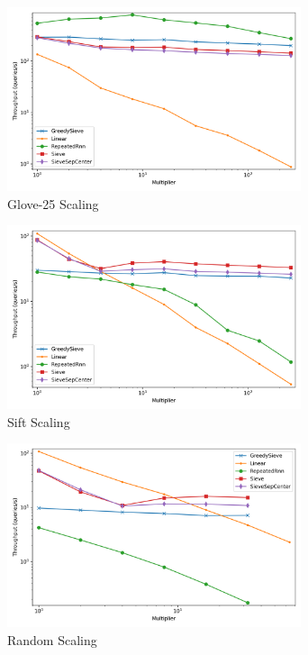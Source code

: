 

\begin{figure}[ht!]
    \centering
    \includegraphics[width=3.4in]{images/result_plots/glove-25_10_scaling.png}
    \caption{
        Glove-25 Scaling
    }
    \label{fig:results:glove-25-scaling}
\end{figure}


\begin{figure}[ht!]
    \centering
    \includegraphics[width=3.4in]{images/result_plots/sift_10_scaling.png}
    \caption{
        Sift Scaling
    }
    \label{fig:results:sift-scaling}
\end{figure}


\begin{figure}[ht!]
    \centering
    \includegraphics[width=3.4in]{images/result_plots/random_placeholder_10_scaling.png}
    \caption{
        Random Scaling
    }
    \label{fig:results:random-scaling}
\end{figure}


